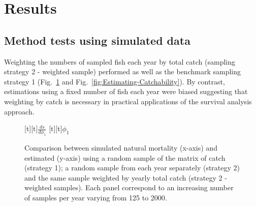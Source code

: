 \documentclass[12pt]{article}
\begin{document}

\section{Results}

    \subsection{Method tests using simulated data}

Weighting the numbers of sampled fish each year by total catch (sampling strategy 2 - weighted sample) performed as well as the benchmark sampling strategy 1 (Fig.~\ref{fig:Estimating-NaturalMortality} and Fig.~\ref{fig:Estimating-Catchability}). By contrast, estimations using a fixed number of fish each year were biased suggesting that weighting by catch is necessary in practical applications of the survival analysis approach. \\

\begin{figure}
[t][t]{{\protect\large $\displaystyle\frac{ds}{d\phi_1}$}}
[t][t]{{\protect\Large $\phi_1$}}
\centering
{}
\vspace{2cm}
\caption{Comparison between simulated natural mortality (x-axis) and estimated (y-axis) using a random sample of the matrix of catch (strategy 1); a random sample from each year separately (strategy 2) and the same sample weighted by yearly total catch (strategy 2 - weighted samples). Each panel correspond to an increasing number of samples per year varying from 125 to 2000.}
\label{fig:Estimating-NaturalMortality}
\end{figure}
\end{document}
